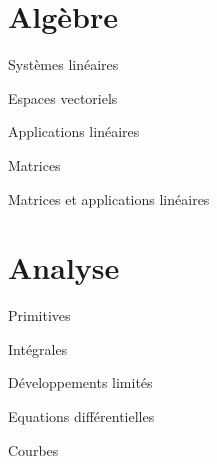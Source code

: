 \documentclass[12pt]{article}
\begin{document}
\part{Algèbre}

\begin{quiz}{Systèmes linéaires}

\end{quiz}


\begin{quiz}{Espaces vectoriels}

\end{quiz}

\begin{quiz}{Applications linéaires}

\end{quiz}

\begin{quiz}{Matrices}

\end{quiz}

\begin{quiz}{Matrices et applications linéaires}

\end{quiz}


\part{Analyse}

\begin{quiz}{Primitives}

\end{quiz}

\begin{quiz}{Intégrales}

\end{quiz}

\begin{quiz}{Développements limités}

\end{quiz}

\begin{quiz}{Equations différentielles}

\end{quiz}

\begin{quiz}{Courbes}

\end{quiz}
\end{document}
